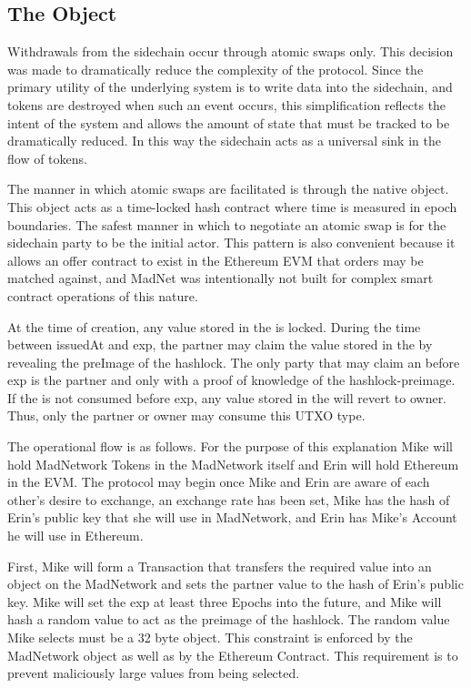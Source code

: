 \subsection{The \AtomicSwap{} Object}



Withdrawals from the sidechain occur through atomic swaps only.
This decision was made to dramatically reduce the complexity of the
protocol.
Since the primary utility of the underlying system is to write data
into the sidechain, and tokens are destroyed when such an event occurs,
this simplification reflects the intent of the system and allows the
amount of state that must be tracked to be dramatically reduced.
In this way the sidechain acts as a universal sink in the flow of
tokens.

The manner in which atomic swaps are facilitated is through the native
\AtomicSwap{} object.
This object acts as a time-locked hash contract where time is measured
in epoch boundaries.
The safest manner in which to negotiate an atomic swap is for the
sidechain party to be the initial actor.
This pattern is also convenient because it allows an offer contract to
exist in the Ethereum EVM that orders may be matched against, and
MadNet was intentionally not built for complex smart contract
operations of this nature.

At the time of creation, any value stored in the \AtomicSwap{} is locked.
During the time between issuedAt and exp, the partner may claim the
value stored in the \AtomicSwap{} by revealing the preImage of the
hashlock.
The only party that may claim an \AtomicSwap{} before exp is the partner
and only with a proof of knowledge of the hashlock-preimage.
If the \AtomicSwap{} is not consumed before exp, any value stored in the
\AtomicSwap{} will revert to owner.
Thus, only the partner or owner may consume this UTXO type.

The operational flow is as follows.
For the purpose of this explanation Mike will hold MadNetwork Tokens in
the MadNetwork itself and Erin will hold Ethereum in the EVM.
The protocol may begin once Mike and Erin are aware of each other's
desire to exchange, an exchange rate has been set, Mike has the hash of
Erin's public key that she will use in MadNetwork, and Erin has
Mike's Account he will use in Ethereum.

First, Mike will form a Transaction that transfers the required value
into an \AtomicSwap{} object on the MadNetwork and sets the partner value
to the hash of Erin's public key.
Mike will set the exp at least three Epochs into the future, and Mike
will hash a random value to act as the preimage of the hashlock.
The random value Mike selects must be a 32 byte object.
This constraint is enforced by the MadNetwork \AtomicSwap{} object as well
as by the Ethereum \AtomicSwap{}Contract.
This requirement is to prevent maliciously large values from being
selected.

